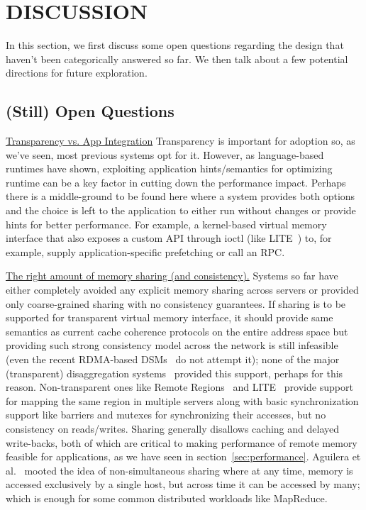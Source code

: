 \section{DISCUSSION}
\label{sec:discussion}
In this section, we first discuss some open questions regarding 
the design that haven't been categorically answered so far. 
We then talk about a few potential directions for future 
exploration.

\subsection{(Still) Open Questions}
\vspace{3pt}
\noindent \uline{Transparency vs. App Integration}
Transparency is important for adoption so, as we've seen, 
most previous systems opt for it. However, as 
language-based runtimes have shown, exploiting 
application hints/semantics for optimizing runtime can be
a key factor in cutting down the performance impact.
Perhaps there is a middle-ground to be found here 
where a system provides both options and the choice is left
to the application to either run without changes or 
provide hints for better performance. For example, 
a kernel-based virtual memory interface that also exposes 
a custom API through 
ioctl (like LITE~\cite{literdma}) to, for example, supply 
application-specific prefetching or call an RPC.

\vspace{3pt}
\noindent \uline{The right amount of memory sharing (and consistency).}
Systems so far have either completely avoided any explicit 
memory sharing across servers or provided only coarse-grained 
sharing with no consistency guarantees. 
If sharing is to be supported for transparent virtual 
memory interface, it should provide same semantics as current 
cache coherence protocols on the entire address space but 
providing such strong consistency model across the network 
is still infeasible (even the recent RDMA-based DSMs~\cite{farm,gam} 
do not attempt it); none of the major (transparent) 
disaggregation systems~\cite{infiniswap,legoos} provided this 
support, perhaps for this reason. Non-transparent ones like 
Remote Regions~\cite{remregions} and LITE~\cite{literdma} provide
support for mapping the same region in multiple servers along with
basic synchronization support like barriers and mutexes for 
synchronizing their accesses, but no consistency on reads/writes. 
Sharing generally disallows caching and delayed write-backs,
both of which are critical to making performance of remote memory 
feasible for applications, as we have seen in 
section~\ref{sec:performance}. Aguilera et al.~\cite{Aguilera2017}
mooted the idea of non-simultaneous sharing where at any time, 
memory is accessed exclusively by a single host, but across 
time it can be accessed by many; which is enough for some common 
distributed workloads like MapReduce.

